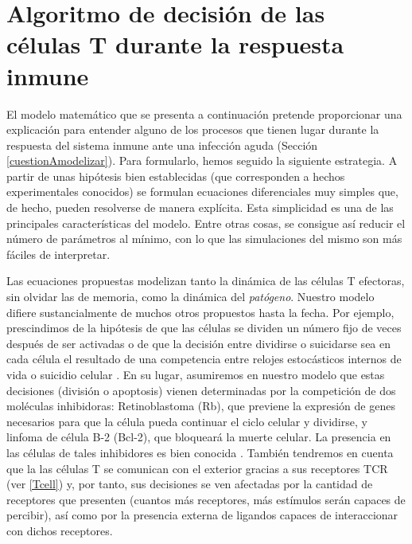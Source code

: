 \chapter{Algoritmo de decisión de las células T durante la respuesta inmune}
\label{cap:descripcionTrabajo}


El modelo matemático que se presenta a continuación pretende proporcionar una explicación para entender alguno de los procesos que tienen lugar durante la respuesta del sistema inmune ante una infección aguda (Sección \ref{cuestionAmodelizar}). Para formularlo, hemos seguido la siguiente estrategia. A partir de unas hipótesis bien establecidas (que corresponden a hechos experimentales conocidos) se formulan ecuaciones diferenciales muy simples que, de hecho, pueden resolverse de manera explícita. Esta simplicidad es una de las principales características del modelo. Entre otras cosas, se consigue así reducir el número de parámetros al mínimo, con lo que las simulaciones del mismo son más fáciles de interpretar. 

Las ecuaciones propuestas modelizan tanto la dinámica de las células T efectoras, sin olvidar las de memoria, como la dinámica del \textit{patógeno}. Nuestro modelo  difiere sustancialmente  de  muchos otros propuestos hasta la fecha. Por ejemplo, prescindimos de la hipótesis de que las células se dividen un número fijo de veces después de ser activadas \citep{JTB} o  de que la decisión entre dividirse o suicidarse sea en cada célula el resultado de una competencia entre relojes estocásticos internos de vida o suicidio celular \citep{JTB}. En su lugar, asumiremos en nuestro modelo que estas decisiones (división o apoptosis) vienen determinadas por la competición de dos moléculas inhibidoras: Retinoblastoma (Rb), que previene la expresión de genes necesarios para que la célula pueda continuar el ciclo celular y dividirse, y linfoma de célula B-2 (Bcl-2), que bloqueará la muerte celular. La presencia en las células de tales inhibidores es bien conocida \citep{fernandez2012mecanica}. También tendremos en cuenta que la las células T se comunican con el exterior gracias a sus receptores TCR (ver \ref{Tcell}) y, por tanto, sus decisiones se ven afectadas por la cantidad de receptores que presenten (cuantos más receptores, más estímulos serán capaces de percibir), así como por la presencia externa de ligandos capaces de interaccionar con dichos receptores.  

